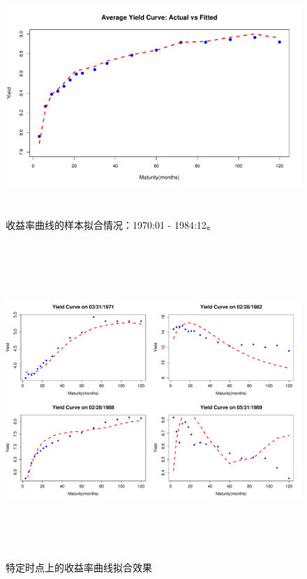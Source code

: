 \begin{figure}\centering%
    \includegraphics[width=15cm,height=9cm]{figures/Rplot02}
   \caption{收益率曲线的样本拟合情况：1970:01 - 1984:12。}
   \label{Rplot02}
  \end{figure}
  \begin{figure}%
      \includegraphics[width=15cm,height=12cm]{figures/Rplot03}
     \caption{特定时点上的收益率曲线拟合效果}
     \label{Rplot03}
    \end{figure} 
   
